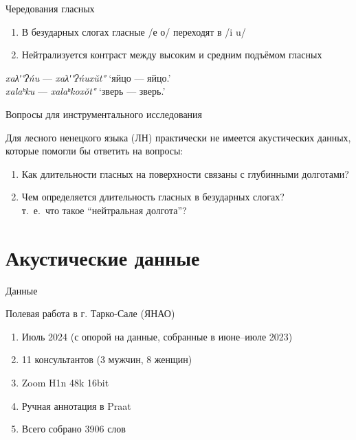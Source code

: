 \documentclass[10 pt, handout]{beamer}
\begin{document}
\begin{frame}{Чередования гласных}

	\begin{enumerate}[\ding{96}]
		\item В безударных слогах гласные /е о/ переходят в /i u/
		\item Нейтрализуется контраст между высоким и средним подъёмом гласных
	\end{enumerate}

		
	\ex	\emph{xaλʹ°ʔńu} --- \emph{xaλʹ°ʔńuxŭt°} \hfill `яйцо --- яйцо.{\Abl}'\\ %
		\emph{xalaʰku} --- \emph{xalaʰkoxŏt°} \hfill `зверь --- зверь.{\Abl}'
	\xe

\end{frame}

\begin{frame}{Вопросы для инструментального исследования}

	Для лесного ненецкого языка (ЛН) практически не имеется акустических данных, которые помогли бы ответить на вопросы:
	\vspace*{1em}
	
	\begin{enumerate}[\ding{50}]
		\item Как длительности гласных на поверхности связаны с глубинными долготами?
		\item Чем определяется длительность гласных в безударных слогах?\\
			т.\ е.\ что такое ``нейтральная долгота''?
	\end{enumerate}

\end{frame}

			\section{Акустические данные} 

\begin{frame}{Данные}

	Полевая работа в г. Тарко-Сале (ЯНАО)

	\begin{enumerate}[\ding{68}]
		\item Июль 2024 (с опорой на данные, собранные в июне--июле 2023)
		\item 11 консультантов (3 мужчин, 8 женщин)
		\item Zoom H1n 48k 16bit
		\item Ручная аннотация в Praat \parencite{praat}
		\item Всего собрано 3906 слов
	\end{enumerate}

\end{frame}
\end{document}
